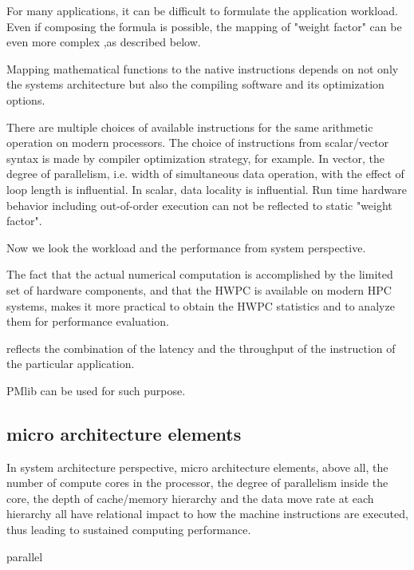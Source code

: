 \documentclass[conference]{IEEEtran}
\begin{document}
For many applications, it can be difficult to formulate
the application workload.
Even if composing the formula is possible, the mapping of "weight factor"
can be even more complex ,as described below.

Mapping mathematical functions to the native instructions
depends on not only the systems architecture but also the compiling software
and its optimization options.

There are multiple choices of available instructions for the same
arithmetic operation on modern processors.
The choice of instructions from scalar/vector syntax is made by
compiler optimization strategy, for example.
In vector, the degree of parallelism, i.e. width of simultaneous data
operation, with the effect of loop length is influential.
In scalar, data locality is influential.
Run time hardware behavior including out-of-order execution can not
be reflected to static "weight factor".

Now we look the workload and the performance from system perspective.

The fact that the actual numerical computation is accomplished by the
limited set of hardware components, and that the HWPC is available
on modern HPC systems, makes it more practical to obtain the HWPC statistics
and to analyze them for performance evaluation.

reflects the combination of the latency and the throughput of the instruction
of the particular application.

PMlib can be used for such purpose.

%
%


\subsection{micro architecture elements}
In system architecture perspective,
micro architecture elements, above all, the number of compute cores
in the processor, the degree of parallelism inside the core,
the depth of cache/memory hierarchy and the data move rate at each hierarchy
all have relational impact to how the machine instructions are executed,
thus leading to sustained computing performance.

parallel
\end{document}
